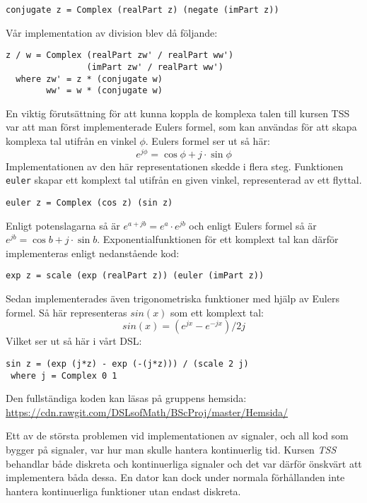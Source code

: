 \documentclass[12pt,a4paper,twoside,openright]{article}
\begin{document}
\begin{verbatim}
conjugate z = Complex (realPart z) (negate (imPart z))
\end{verbatim}
Vår implementation av division blev då följande:
\begin{verbatim}
z / w = Complex (realPart zw' / realPart ww')
                (imPart zw' / realPart ww')
  where zw' = z * (conjugate w)
        ww' = w * (conjugate w)
\end{verbatim}

En viktig förutsättning för att kunna koppla de komplexa talen till
kursen TSS var att man först implementerade Eulers formel, som kan
användas för att skapa komplexa tal utifrån en vinkel \(\phi\). Eulers
formel ser ut så här:
\[e^{j\phi}=\cos \phi+ j \cdot \sin \phi \]
Implementationen av den här representationen skedde i flera steg.
Funktionen \texttt{euler} skapar ett komplext tal utifrån
en given vinkel, representerad av ett flyttal.
\begin{verbatim}
euler z = Complex (cos z) (sin z)
\end{verbatim}
Enligt potenslagarna %
så är \(e^{a+jb} = e^{a} \cdot e^{jb}\) och enligt Eulers formel så är
\(e^{j b} = \cos b + j\cdot \sin b\).
%
Exponentialfunktionen för ett komplext tal kan därför implementeras
enligt nedanstående kod:

\begin{verbatim}
exp z = scale (exp (realPart z)) (euler (imPart z))
\end{verbatim}
Sedan implementerades även trigonometriska funktioner med hjälp av
Eulers formel. Så här representeras $sin(x)$ som ett komplext tal:
\[ sin(x) = (e^{j x} - e^{-j x}) / 2 j \]
Vilket ser ut så här i vårt DSL:
\begin{verbatim}
sin z = (exp (j*z) - exp (-(j*z))) / (scale 2 j)
 where j = Complex 0 1
\end{verbatim}

Den fullständiga koden kan läsas på gruppens hemsida:
\url{https://cdn.rawgit.com/DSLsofMath/BScProj/master/Hemsida/}

Ett av de största problemen vid implementationen av signaler, och all
kod som bygger på signaler, var hur man skulle hantera kontinuerlig
tid. Kursen \textit{TSS} behandlar både diskreta och kontinuerliga
signaler och det var därför önskvärt att implementera båda dessa. En
dator kan dock under normala förhållanden inte hantera kontinuerliga
funktioner utan endast diskreta. %
\end{document}

